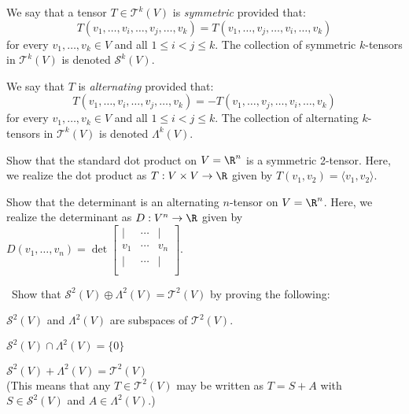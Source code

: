 \documentclass{book}
\begin{document}
\begin{definition}
We say that a tensor $T\in\mathcal{T}^k(V)$ is {\em symmetric} provided that:
$$
T(v_1, \ldots, v_i, \ldots, v_j, \ldots, v_k)=T(v_1, \ldots, v_j, \ldots, v_i, \ldots, v_k)
$$
for every $v_1, \ldots , v_k\in V$ and all $1\leq i< j\leq k$.  
The collection of symmetric $k$-tensors in $\mathcal{T}^k(V)$ is denoted $\mathcal{S}^k(V)$.

We say that $T$ is {\em alternating} provided that:
$$
T(v_1, \ldots, v_i, \ldots, v_j, \ldots, v_k)=-T(v_1, \ldots, v_j, \ldots, v_i, \ldots, v_k)
$$
for every $v_1, \ldots , v_k\in V$ and all $1\leq i< j\leq k$.  
The collection of alternating $k$-tensors in $\mathcal{T}^k(V)$ is denoted $\Lambda^k(V)$.
\end{definition}

\begin{exercise}
Show that the standard dot product on $V=\R^n$ is a symmetric 2-tensor.
Here, we realize the dot product as $T:V\times V\to\R$ given by
$T(v_1, v_2)=\langle v_1, v_2\rangle$.
\end{exercise}

\begin{exercise}
Show that the determinant is an alternating $n$-tensor on $V=\R^n$.
Here, we realize the determinant as $D:V^n\to\R$ given by 
$\displaystyle{D(v_1, \ldots, v_n)=\det\left[
\begin{array}{ccc}
| & \cdots & | \\
v_1 & \cdots & v_n \\
| & \cdots & | \\
\end{array}
\right].}$
\end{exercise}

\begin{exercise}\
Show that $\mathcal{S}^2(V)\oplus\Lambda^2(V)=\mathcal{T}^2(V)$ by proving the following:
\begin{exerenm}
\item
$\mathcal{S}^2(V)$ and $\Lambda^2(V)$ are subspaces of $\mathcal{T}^2(V)$.

\item
$\mathcal{S}^2(V)\cap\Lambda^2(V)=\{0\}$

\item
$\mathcal{S}^2(V)+\Lambda^2(V)=\mathcal{T}^2(V)$ \\ (This means that any $T\in\mathcal{T}^2(V)$
may be written as $T=S+A$ with $S\in\mathcal{S}^2(V)$ and $A\in\Lambda^2(V)$.)
\end{exerenm}
\end{exercise}
\end{document}
